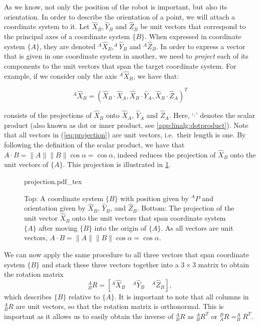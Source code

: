 As we know, not only the position of the robot is important, but also its orientation.
In order to describe the orientation of a point, we will attach a coordinate system to it. Let $ \hat{X}_B, \hat{Y}_B$ and $ \hat{Z}_B$ be unit vectors that correspond to the principal axes of a coordinate system $\{B\}$.
When expressed in coordinate system $\{A\}$, they are denoted $^A\hat{X}_B, ^A\hat{Y}_B$ and $ ^A\hat{Z}_B$.
In order to express a vector that is given in one coordinate system in another, we need to \textsl{project} each of its components to the unit vectors that span the target coordinate system. For example, if we consider only the axis $^A\hat{X}_B$, we have that:

\begin{equation}\label{eq:projection}
^A\hat{X}_B=(\hat{X}_B\cdot\hat{X}_A, \hat{X}_B\cdot\hat{Y}_A,\hat{X}_B\cdot\hat{Z}_A)^T
\end{equation}

consists of the projections of $\hat{X}_B$ onto $\hat{X}_A$, $\hat{Y}_A$ and $\hat{Z}_A$. Here, `$\cdot$' denotes the scalar product (also known as dot or inner product, see \cref{app:linalg:dotproduct}).
Note that all vectors in (\ref{eq:projection}) are unit vectors, i.e.\ their length is one.
By following the definition of the scalar product, we have that $A\cdot B=\|A\|\|B\|\cos \alpha=\cos \alpha$, indeed reduces the projection of $\hat{X}_B$ onto the unit vectors of $\{A\}$. This projection is illustrated in \cref{fig:projection}.

\begin{figure}
    \centering
    \def\svgwidth{0.8\textwidth}
    {projection.pdf_tex}
    \caption{Top: A coordinate system $\{B\}$ with position given by $^AP$ and orientation given by $\hat{X}_B$, $\hat{Y}_B$, and $\hat{Z}_B$. Bottom:
    The projection of the unit vector $\hat{X}_B$ onto the unit vectors that span coordinate system $\{A\}$ after moving $\{B\}$ into the origin of $\{A\}$. As all vectors are unit vectors, $A\cdot B=\|A\|\|B\|\cos \alpha=\cos \alpha$. }
    \label{fig:projection}
\end{figure}

We can now apply the same procedure to all three vectors that span coordinate system $\{B\}$ and stack these three vectors together into a $3\times3$ matrix to obtain the rotation matrix
%
\begin{equation}
^A_BR=[^A\hat{X}_B \quad ^A\hat{Y}_B \quad ^A\hat{Z}_B]   ,
\end{equation}
%
which describes $\{B\}$ relative to $\{A\}$.
It is important to note that all columns in $ ^A_BR$ are unit vectors, so that the rotation matrix is orthonormal.
This is important as it allows us to easily obtain the inverse of $ ^A_BR$ as $ ^A_BR^T$ or
$ ^B_AR=^A_BR^T$.

